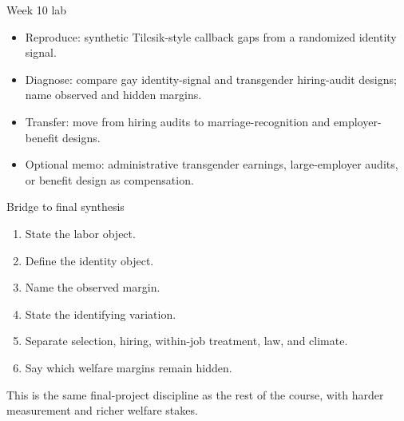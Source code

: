 \documentclass[aspectratio=169,11pt]{beamer}
\begin{document}
\begin{frame}{Week 10 lab}
\begin{itemize}
    \item Reproduce: synthetic Tilcsik-style callback gaps from a randomized identity signal.
    \item Diagnose: compare gay identity-signal and transgender hiring-audit designs; name observed and hidden margins.
    \item Transfer: move from hiring audits to marriage-recognition and employer-benefit designs.
    \item Optional memo: administrative transgender earnings, large-employer audits, or benefit design as compensation.
\end{itemize}
\end{frame}

\begin{frame}{Bridge to final synthesis}
\begin{enumerate}
    \item State the labor object.
    \item Define the identity object.
    \item Name the observed margin.
    \item State the identifying variation.
    \item Separate selection, hiring, within-job treatment, law, and climate.
    \item Say which welfare margins remain hidden.
\end{enumerate}
\vspace{0.2cm}
This is the same final-project discipline as the rest of the course, with harder measurement and richer welfare stakes.
\end{frame}
\end{document}
